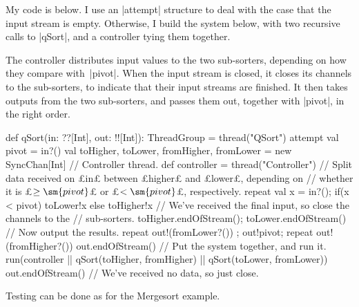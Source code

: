 \begin{answerS}
My code is below.  I use an |attempt| structure to deal with the case that the
input stream is empty.  Otherwise, I build the system below, with two
recursive calls to |qSort|, and a controller tying them together.
%
\begin{center}
\end{center}
%
The controller distributes input values to the two sub-sorters, depending on
how they compare with~|pivot|.  When the input stream is closed, it closes its
channels to the sub-sorters, to indicate that their input streams are
finished.  It then takes outputs from the two sub-sorters, and passes them
out, together with |pivot|, in the right order.
%
\begin{scala}
  def qSort(in: ??[Int], out: !![Int]): ThreadGroup = thread("QSort"){
    attempt{
      val pivot = in?()
      val toHigher, toLower, fromHigher, fromLower = new SyncChan[Int]
      // Controller thread.
      def controller = thread("Controller"){
	// Split data received on £in£ between £higher£ and £lower£, depending on
	// whether it is £$\ge \sm{pivot}$£ or £$< \sm{pivot}$£, respectively.
	repeat{ val x = in?(); if(x < pivot) toLower!x else toHigher!x }
	// We've received the final input, so close the channels to the
	// sub-sorters.
	toHigher.endOfStream(); toLower.endOfStream()
	// Now output the results.
	repeat{ out!(fromLower?()) }; out!pivot; repeat{ out!(fromHigher?()) }
	out.endOfStream()
      }      
      // Put the system together, and run it.
      run(controller || qSort(toHigher, fromHigher) || qSort(toLower, fromLower))
    }{ out.endOfStream() } // We've received no data, so just close.
  }
\end{scala}

Testing can be done as for the Mergesort example. 
\end{answerS}
